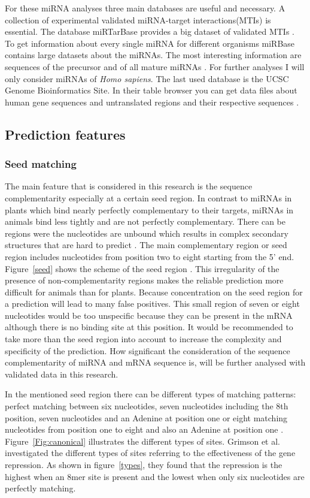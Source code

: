 \documentclass[12pt]{article}
\begin{document}
For these miRNA analyses three main databases are useful and necessary. A collection of experimental validated miRNA-target interactions(MTIs) is essential. The database miRTarBase provides a big dataset of validated MTIs \cite{Hsu}. To get information about every single miRNA for different organisms miRBase contains large datasets about the miRNAs. The most interesting information are sequences of the precursor and of all mature miRNAs \cite{mirbase}. For further analyses I will only consider miRNAs of \textit{Homo sapiens}. The last used database is the UCSC Genome Bioinformatics Site. In their table browser you can get data files about human gene sequences and untranslated regions and their respective sequences \cite{ucsc}.
  

\subsection{Prediction features}
\subsubsection{Seed matching}
The main feature that is considered in this research is the sequence complementarity especially at a certain seed region. In contrast to miRNAs in plants which bind nearly perfectly complementary to their targets, miRNAs in animals bind less tightly and are not perfectly complementary. There can be regions were the nucleotides are unbound which results in complex secondary structures that are hard to predict \cite{Rehmsmeier}. The main complementary region or seed region includes nucleotides from position two to eight starting from the 5' end. Figure~\ref{seed} shows the scheme of the seed region \cite{Peterson}. This irregularity of the presence of non-complementarity regions makes the reliable prediction more difficult for animals than for plants. Because concentration on the seed region for a prediction will lead to many false positives. This small region of seven or eight nucleotides would be too unspecific because they can be present in the mRNA although there is no binding site at this position. It would be recommended to take more than the seed region into account to increase the complexity and specificity of the prediction. How significant the consideration of the sequence complementarity of miRNA and mRNA sequence is, will be further analysed with validated data in this research. 

In the mentioned seed region there can be different types of matching patterns: perfect matching between six nucleotides, seven nucleotides including the 8th position, seven nucleotides and an Adenine at position one or eight matching nucleotides from position one to eight and also an Adenine at position one  \cite{Lewis} \cite{Brennecke} \cite{Krek}. Figure~\ref{Fig:canonical} illustrates the different types of sites. Grimson et al. \cite{Grimson} investigated the different types of sites referring to the effectiveness of the gene repression. As shown in figure~\ref{types}, they found that the repression is the highest when an 8mer site is present and the lowest when only six nucleotides are perfectly matching.
\end{document}
